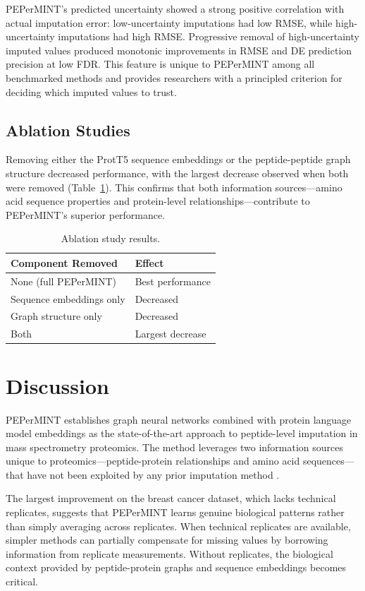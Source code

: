\documentclass[12pt]{article}
\begin{document}
PEPerMINT's predicted uncertainty showed a strong positive correlation with actual imputation error: low-uncertainty imputations had low RMSE, while high-uncertainty imputations had high RMSE. Progressive removal of high-uncertainty imputed values produced monotonic improvements in RMSE and DE prediction precision at low FDR. This feature is unique to PEPerMINT among all benchmarked methods and provides researchers with a principled criterion for deciding which imputed values to trust.

\subsection{Ablation Studies}

Removing either the ProtT5 sequence embeddings or the peptide-peptide graph structure decreased performance, with the largest decrease observed when both were removed (Table~\ref{tab:ablation}). This confirms that both information sources---amino acid sequence properties and protein-level relationships---contribute to PEPerMINT's superior performance.

\begin{table}[ht]
\centering
\caption{Ablation study results.}
\label{tab:ablation}
\begin{tabular}{ll}
\toprule
Component Removed & Effect \\
\midrule
None (full PEPerMINT) & Best performance \\
Sequence embeddings only & Decreased \\
Graph structure only & Decreased \\
Both & Largest decrease \\
\bottomrule
\end{tabular}
\end{table}

\section{Discussion}

PEPerMINT establishes graph neural networks combined with protein language model embeddings as the state-of-the-art approach to peptide-level imputation in mass spectrometry proteomics. The method leverages two information sources unique to proteomics---peptide-protein relationships and amino acid sequences---that have not been exploited by any prior imputation method \citep{velickovic2023graph, elnaggar2021prottrans}.

The largest improvement on the breast cancer dataset, which lacks technical replicates, suggests that PEPerMINT learns genuine biological patterns rather than simply averaging across replicates. When technical replicates are available, simpler methods can partially compensate for missing values by borrowing information from replicate measurements. Without replicates, the biological context provided by peptide-protein graphs and sequence embeddings becomes critical.
\end{document}
